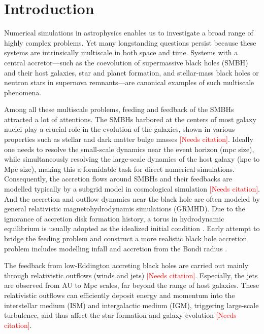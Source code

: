 \documentclass{article}
\newcommand{\red}{\textcolor{red}}
\newcommand{\AddCite}{\red{[Needs citation]}}
\newcommand{\hywcom}[1]{{\color{purple}{[HYW: #1]}}}
\begin{document}
\section{Introduction}

\hywcom{Multiscale problems.}
Numerical simulations in astrophysics enables us to investigate a broad range of highly complex problems.
Yet many longstanding questions persist because these systems are intrinsically multiscale in both space and time.
Systems with a central accretor—such as the coevolution of supermassive black holes (SMBH) and their host galaxies, star and planet formation, and stellar-mass black holes or neutron stars in supernova remnants—are canonical examples of such multiscale phenomena.

Among all these multiscale problems, feeding and feedback of the SMBHs attracted a lot of attentions.
The SMBHs harbored at the centers of most galaxy nuclei play a crucial role in the evolution of the galaxies, shown in various properties such as stellar and dark matter bulge masses \AddCite.
Ideally one needs to resolve the small-scale dynamics near the event horizon (mpc size), while simultaneously
resolving the large-scale dynamics of the host galaxy (kpc to Mpc size),
making this a formidable task for direct numerical simulations.
Consequently, the accretion flows around SMBHs and their feedbacks are modelled typically by a subgrid model in cosmological simulation \AddCite. 
And the accretion and outflow dynamics near the black hole are often modeled by general relativistic magnetohydrodynamis simulations (GRMHD).
Due to the ignorance of accretion disk formation history, a torus in hydrodynamic equilibrium is usually adopted as the idealized initial condition \cite{1976ApJ...207..962F}.
Early attempt to bridge the feeding problem and construct a more realistic black hole accretion problem includes modelling infall and accretion from the Bondi radius \cite{Bondi:1952MNRAS.112..195B}.

\hywcom{Relativistic outflows.}
The feedback from low-Eddington accreting black holes are carried out mainly through relativistic outflows (winds and jets) \AddCite.
Especially, the jets are observed from AU to Mpc scales, far beyond the range of host galaxies. 
These relativistic outflows can efficiently deposit energy and momentum into the interstellar medium (ISM) and intergalactic medium (IGM), triggering large-scale turbulence, and thus affect the star formation and galaxy evolution \AddCite.
\end{document}
